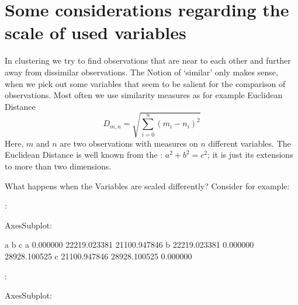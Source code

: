 \documentclass[letterpaper,10pt,english]{jupyterBook}
\begin{document}
\section{Some considerations regarding the scale of used variables}
\label{\detokenize{Text_Clustering:some-considerations-regarding-the-scale-of-used-variables}}
\sphinxAtStartPar
In clustering we try to find observations that are near to each other and further away from dissimilar observations. The Notion of ‘similar’ only makes sense, when we pick out some variables that seem to be salient for the comparison of observations.
Most often we use similarity measures as for example Euclidean Distance
\label{equation:Text_Clustering:843e3f50-f2f4-4095-b9ba-9f83cc89b9a4}\begin{equation}
D_{m, n} = \sqrt{\sum_{i=0}^n (m_i - n_i)^2}
\end{equation}
\sphinxAtStartPar
Here, \(m\) and \(n\) are two observations with measures on \(n\) different variables. The Euclidean Distance is well known from the : \(a^2 + b^2 = c^2\); it is just its extensions to more than two dimensions.

\sphinxAtStartPar
What happens when the Variables are scaled differently? Consider for example: 

\sphinxAtStartPar
{}:

\begin{sphinxVerbatim}[commandchars=\\\{\}]
\PYGZlt{}AxesSubplot:\PYGZgt{}
\end{sphinxVerbatim}

\noindent{}

\begin{sphinxVerbatim}[commandchars=\\\{\}]
              a             b             c
a      0.000000  22219.023381  21100.947846
b  22219.023381      0.000000  28928.100525
c  21100.947846  28928.100525      0.000000
\end{sphinxVerbatim}

\sphinxAtStartPar
{}:

\begin{sphinxVerbatim}[commandchars=\\\{\}]
\PYGZlt{}AxesSubplot:\PYGZgt{}
\end{sphinxVerbatim}
\end{document}
